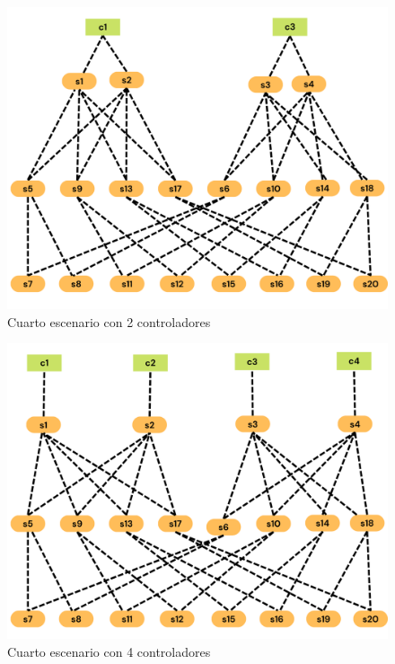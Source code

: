 \documentclass[a4paper, 12pt]{book}
\begin{document}
	\begin{figure}[H]
		\centering
		\includegraphics[width=16cm, keepaspectratio]{img/e4_2}
		\caption{Cuarto escenario con 2 controladores}
		\label{figura:e4_2}
	\end{figure}
	
	
	\begin{figure}[H]
		\centering
		\includegraphics[width=16cm, keepaspectratio]{img/e4_3}
		\caption{Cuarto escenario con 4 controladores}
		\label{figura:e4_3}
	\end{figure}

	
\end{document}
